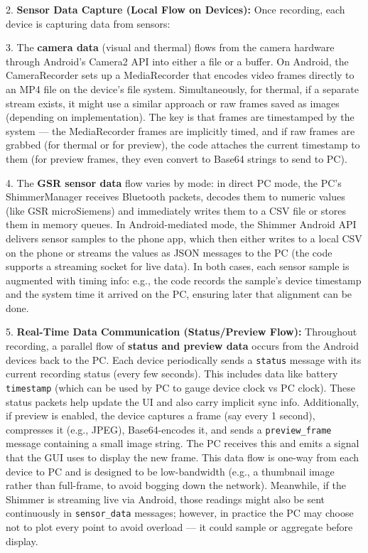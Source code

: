 2.  \textbf{Sensor Data Capture (Local Flow on Devices):} Once recording,
    each device is capturing data from sensors:

3.  The \textbf{camera data} (visual and thermal) flows from the camera
    hardware through Android's Camera2 API into either a file or a
    buffer. On Android, the CameraRecorder sets up a MediaRecorder that
    encodes video frames directly to an MP4 file on the device's file
    system\cite{ref41}\cite{ref42}.
    Simultaneously, for thermal, if a separate stream exists, it might
    use a similar approach or raw frames saved as images (depending on
    implementation). The key is that frames are timestamped by the
    system --- the MediaRecorder frames are implicitly timed, and if raw
    frames are grabbed (for thermal or for preview), the code attaches
    the current timestamp to them (for preview frames, they even convert
    to Base64 strings to send to PC).

4.  The \textbf{GSR sensor data} flow varies by mode: in direct PC mode, the
    PC's ShimmerManager receives Bluetooth packets, decodes them to
    numeric values (like GSR microSiemens) and immediately writes them
    to a CSV file or stores them in memory
    queues\cite{ref43}\cite{ref12}.
    In Android-mediated mode, the Shimmer Android API delivers sensor
    samples to the phone app, which then either writes to a local CSV on
    the phone or streams the values as JSON messages to the PC (the code
    supports a streaming socket for live
    data\cite{ref44}\cite{ref45}).
    In both cases, each sensor sample is augmented with timing info:
    e.g., the code records the sample's device timestamp and the system
    time it arrived on the
    PC\cite{ref12},
    ensuring later that alignment can be done.

5.  \textbf{Real-Time Data Communication (Status/Preview Flow):} Throughout
    recording, a parallel flow of \textbf{status and preview data} occurs
    from the Android devices back to the PC. Each device periodically
    sends a \texttt{status} message with its current recording status (every
    few
    seconds)\cite{ref46}\cite{ref47}.
    This includes data like battery %
    \texttt{timestamp} (which can be used by PC to gauge device clock vs PC
    clock). These status packets help update the UI and also carry
    implicit sync info. Additionally, if preview is enabled, the device
    captures a frame (say every 1 second), compresses it (e.g., JPEG),
    Base64-encodes it, and sends a \texttt{preview_frame} message containing a
    small image
    string\cite{ref7}.
    The PC receives this and emits a signal that the GUI uses to display
    the new frame. This data flow is one-way from each device to PC and
    is designed to be low-bandwidth (e.g., a thumbnail image rather than
    full-frame, to avoid bogging down the network). Meanwhile, if the
    Shimmer is streaming live via Android, those readings might also be
    sent continuously in \texttt{sensor_data}
    messages\cite{ref35};
    however, in practice the PC may choose not to plot every point to
    avoid overload --- it could sample or aggregate before display.

